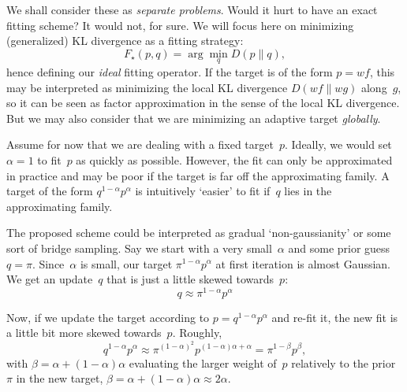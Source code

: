 \documentclass{article}
\begin{document}
We shall consider these as {\em separate problems}. Would it hurt to have an exact fitting scheme? It would not, for sure. We will focus here on minimizing (generalized) KL divergence as a fitting strategy:
$$
F_\star(p, q) = \arg\min_q D(p\|q),
$$
hence defining our {\em ideal} fitting operator. If the target is of the form $p=wf$, this may be interpreted as minimizing the local KL divergence $D(wf\|wg)$ along~$g$, so it can be seen as factor approximation in the sense of the local KL divergence. But we may also consider that we are minimizing an adaptive target {\em globally}.

Assume for now that we are dealing with a fixed target~$p$. Ideally, we would set $\alpha=1$ to fit~$p$ as quickly as possible. However, the fit can only be approximated in practice and may be poor if the target is far off the approximating family. A target of the form $q^{1-\alpha}p^\alpha$ is intuitively `easier' to fit if~$q$ lies in the approximating family. 



The proposed scheme could be interpreted as gradual `non-gaussianity' or some sort of bridge sampling. Say we start with a very small~$\alpha$ and some prior guess~$q=\pi$. Since~$\alpha$ is small, our target $\pi^{1-\alpha}p^\alpha$ at first iteration is almost Gaussian. We get an update~$q$ that is just a little skewed towards~$p$:
$$
q \approx \pi^{1-\alpha} p^\alpha
$$

Now, if we update the target according to $p=q^{1-\alpha}p^\alpha$ and re-fit it, the new fit is a little bit more skewed towards~$p$. Roughly,
$$
q^{1-\alpha} p^\alpha 
\approx \pi^{(1-\alpha)^2} p^{(1-\alpha)\alpha + \alpha}
= \pi^{1-\beta} p^{\beta},
$$
with $\beta=\alpha+(1-\alpha)\alpha$ evaluating the larger weight of~$p$ relatively to the prior~$\pi$ in the new target, $\beta=\alpha+(1-\alpha)\alpha\approx 2\alpha$. 
\end{document}
